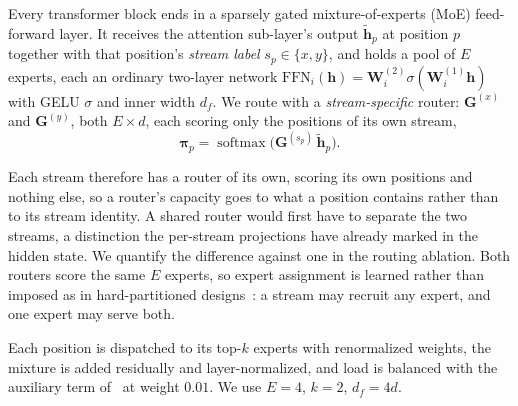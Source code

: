 Every transformer block ends in a sparsely gated mixture-of-experts
(MoE) feed-forward layer. It receives the attention sub-layer's output
$\tilde{\mathbf{h}}_p$ at position $p$ together with that position's
\emph{stream label} $s_p \in \{x, y\}$, and holds a pool of $E$
experts, each an ordinary two-layer network
$\mathrm{FFN}_i(\mathbf{h}) = \mathbf{W}^{(2)}_i
\sigma(\mathbf{W}^{(1)}_i \mathbf{h})$ with GELU $\sigma$ and inner
width $d_f$. We route with a \emph{stream-specific} router:
$\mathbf{G}^{(x)}$ and $\mathbf{G}^{(y)}$, both $E \times d$, each
scoring only the positions of its own stream,
\begin{equation}
  \boldsymbol{\pi}_p
  = \operatorname{softmax}\bigl(\mathbf{G}^{(s_p)}\,
      \tilde{\mathbf{h}}_p\bigr).
  \label{eq:permod_router}
\end{equation}

Each stream therefore has a router of its own, scoring its own
positions and nothing else, so a router's capacity goes to what a
position contains rather than to its stream identity. A shared router
would first have to separate the two streams, a distinction the
per-stream projections have already marked in the hidden state. We
quantify the difference against one in the routing ablation. Both
routers score the same $E$ experts, so expert assignment is learned
rather than imposed as in hard-partitioned designs~\cite{moma}: a
stream may recruit any expert, and one expert may serve both.

Each position is dispatched to its top-$k$ experts with renormalized
weights, the mixture is added residually and layer-normalized, and load
is balanced with the auxiliary term of~\cite{fedus2022switch} at weight
$0.01$. We use $E = 4$, $k = 2$, $d_f = 4d$.
